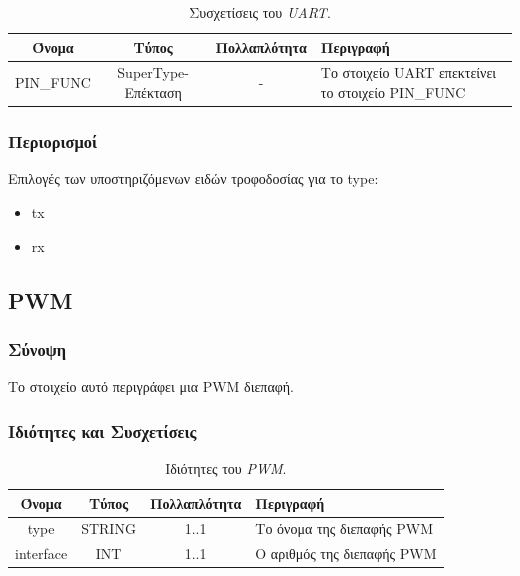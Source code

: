 \begin{table}[H]
	\begin{center}
		\caption{Συσχετίσεις του \textit{UART}.}
		\label{tab:uart2}
		\begin{tabular}{ | c | c | c| m{5.5cm} | }
			\hline
			\rowcolor{Gray}
			Όνομα & Τύπος & Πολλαπλότητα & Περιγραφή \\
			\hline
			PIN\_FUNC & SuperType-Επέκταση & - &  Το στοιχείο UART επεκτείνει το στοιχείο PIN\_FUNC \\
			\hline
		\end{tabular}
	\end{center}
\end{table}

\subsubsection*{Περιορισμοί}

\noindent Επιλογές των υποστηριζόμενων ειδών τροφοδοσίας για το type:

\begin{itemize}
	\item tx
	\item rx
\end{itemize}

\subsection{PWM}
\label{subsec:pwm}

\subsubsection*{Σύνοψη}

\noindent Το στοιχείο αυτό περιγράφει μια PWM διεπαφή.

\subsubsection*{Ιδιότητες και Συσχετίσεις}

\begin{table}[H]
	\begin{center}
		\caption{Ιδιότητες του \textit{PWM}.}
		\label{tab:pwm1}
		\begin{tabular}{ | c | c | c| m{5.5cm} | }
			\hline
			\rowcolor{Gray}
			Όνομα & Τύπος & Πολλαπλότητα & Περιγραφή \\
			\hline
			type & STRING & 1..1 & Το όνομα της διεπαφής PWM \\
			\hline
			interface & INT & 1..1 & Ο αριθμός της διεπαφής PWM \\
			\hline
		\end{tabular}
	\end{center}
\end{table}

